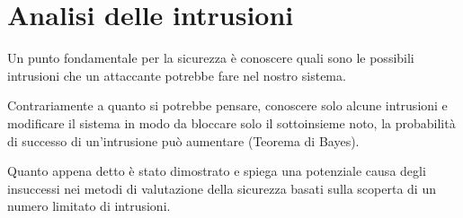 \chapter{Analisi delle intrusioni}
Un punto fondamentale per la sicurezza è conoscere quali sono le possibili intrusioni che un attaccante potrebbe fare
nel nostro sistema.

Contrariamente a quanto si potrebbe pensare, conoscere solo alcune intrusioni e modificare il sistema in modo da
bloccare solo il sottoinsieme noto, la probabilità di successo di un'intrusione può aumentare (Teorema di Bayes).

Quanto appena detto è stato dimostrato e spiega una potenziale causa degli insuccessi nei metodi di valutazione della
sicurezza basati sulla scoperta di un numero limitato di intrusioni.